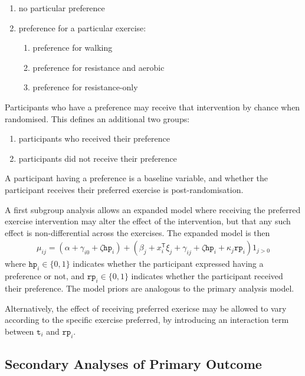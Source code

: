\documentclass[11pt,parskip=half-]{scrartcl}
\providecommand{\tightlist}{%
  \setlength{\itemsep}{0pt}\setlength{\parskip}{0pt}}
\begin{document}
\begin{enumerate}\tightlist
  \item no particular preference
  \item preference for a particular exercise:
        \begin{enumerate}\tightlist
          \item preference for walking
          \item preference for resistance and aerobic
          \item preference for resistance-only
        \end{enumerate}
\end{enumerate}

Participants who have a preference may receive that intervention by chance when randomised. This defines an additional two groups:
\begin{enumerate}\tightlist
  \item participants who received their preference
  \item participants did not receive their preference
\end{enumerate}

A participant having a preference is a baseline variable, and whether the participant receives their preferred exercise is post-randomisation.

A first subgroup analysis allows an expanded model where receiving the preferred exercise intervention may alter the effect of the intervention, but that any such effect is non-differential across the exercises.
The expanded model is then
$$
  \begin{aligned}
    \mu_{ij} = (\alpha + \gamma_{i0} + \zeta\texttt{hp}_i) + (\beta_j + x_i^{\mathsf{T}}\xi_{j} + \gamma_{ij} + \zeta\texttt{hp}_i + \kappa_j\texttt{rp}_i)1_{j>0}
  \end{aligned}
$$
where $\texttt{hp}_i\in\{0,1\}$ indicates whether the participant expressed having a preference or not, and $\texttt{rp}_i\in\{0,1\}$ indicates whether the participant received their preference. The model priors are analogous to the primary analysis model.

Alternatively, the effect of receiving preferred exericse may be allowed to vary according to the specific exercise preferred, by introducing an interaction term between $\texttt{t}_i$ and $\texttt{rp}_i$.

\subsection{Secondary Analyses of Primary Outcome}\label{secondary-analyses-primary}
\end{document}
